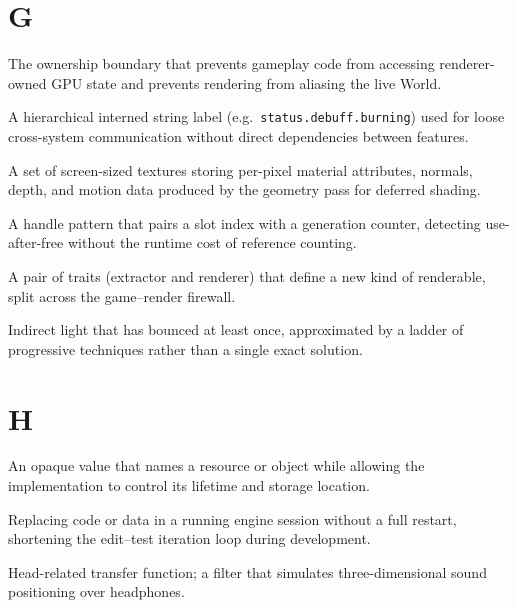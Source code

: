 \documentclass[
  11pt,
  letterpaper,
  DIV=11,
  numbers=noendperiod,
  twoside,
  open=right]{scrreprt}
\providecommand{\tightlist}{%
  \setlength{\itemsep}{0pt}\setlength{\parskip}{0pt}}
\begin{document}
\section*{G}\label{g}


\begin{description}
\tightlist
\item[\textbf{Game--render firewall}]
The ownership boundary that prevents gameplay code from accessing
renderer-owned GPU state and prevents rendering from aliasing the live
World.
\item[\textbf{Gameplay tag}]
A hierarchical interned string label
(e.g.~\texttt{status.debuff.burning}) used for loose cross-system
communication without direct dependencies between features.
\item[\textbf{GBuffer}]
A set of screen-sized textures storing per-pixel material attributes,
normals, depth, and motion data produced by the geometry pass for
deferred shading.
\item[\textbf{Generational index}]
A handle pattern that pairs a slot index with a generation counter,
detecting use-after-free without the runtime cost of reference counting.
\item[\textbf{Geometry backend}]
A pair of traits (extractor and renderer) that define a new kind of
renderable, split across the game--render firewall.
\item[\textbf{Global illumination (GI)}]
Indirect light that has bounced at least once, approximated by a ladder
of progressive techniques rather than a single exact solution.
\end{description}

\section*{H}\label{h}


\begin{description}
\tightlist
\item[\textbf{Handle}]
An opaque value that names a resource or object while allowing the
implementation to control its lifetime and storage location.
\item[\textbf{Hot reload}]
Replacing code or data in a running engine session without a full
restart, shortening the edit--test iteration loop during development.
\item[\textbf{HRTF}]
Head-related transfer function; a filter that simulates
three-dimensional sound positioning over headphones.
\end{description}
\end{document}
